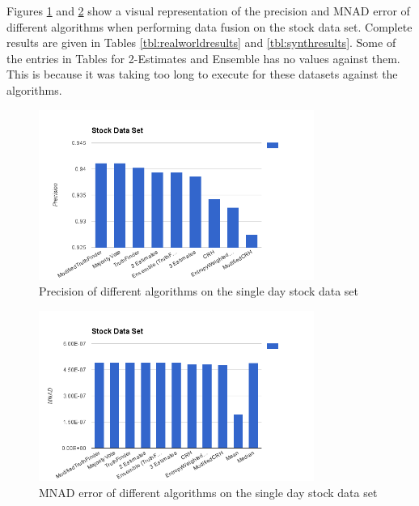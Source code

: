 \documentclass{acm_proc_article-sp}
\begin{document}
Figures \ref{fig:precision} and \ref{fig:mnad} show a visual representation of the precision and MNAD error of different algorithms when performing data fusion on the stock data set. Complete results are given in Tables \ref{tbl:realworldresults} and \ref{tbl:synthresults}. Some of the entries in Tables for 2-Estimates and Ensemble has no values against them. This is because it was taking too long to execute for these datasets against the algorithms. 



\begin{figure}
\centering
\includegraphics[width=9cm]{StockPrecision.png}
\caption{Precision of different algorithms on the single day stock data set}
\label{fig:precision}
\end{figure}


\begin{figure}
\centering
\includegraphics[width=9cm]{StockMNAD.png}
\caption{MNAD error of different algorithms on the single day stock data set}
\label{fig:mnad}
\end{figure}
\end{document}
